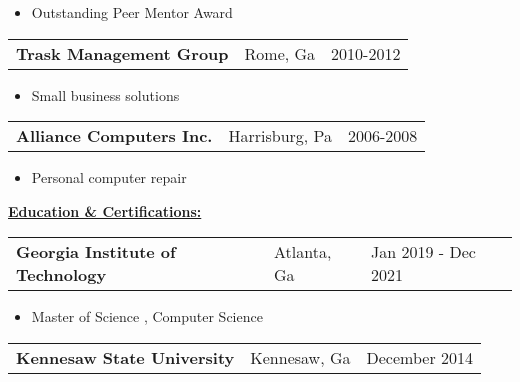 \documentclass{book}
\newenvironment{myitemize}
{ \begin{itemize}
	\setlength{\itemsep}{0pt}
	\setlength{\parskip}{0pt}
	\setlength{\parsep}{0pt}     }
{ \end{itemize}                  }
\begin{document}
	\begin{myitemize}
		\item Outstanding Peer Mentor Award 
	\end{myitemize} 


\begin{tabular}{L{3in}L{1.75in}R{1.75in}}

	 {\large {\bfseries Trask Management Group}} & Rome, Ga & 2010-2012 \\

\end{tabular}

\begin{myitemize}
	
	\item Small business solutions

\end{myitemize}

\begin{tabular}{L{3in}L{1.75in}R{1.75in}}

	 {\large {\bfseries Alliance Computers Inc.}} & Harrisburg, Pa & 2006-2008 \\

\end{tabular}

\begin{myitemize}
	
	\item Personal computer repair

\end{myitemize}

\underline{\Large {\bfseries Education \& Certifications:}}

\enspace

\begin{tabular}{L{3in}L{1.75in}R{1.75in}}

	{\large {\bfseries Georgia Institute of Technology}} & Atlanta, Ga & Jan 2019 - Dec 2021 \\%

\end{tabular}

\begin{myitemize}

	\item Master of Science , Computer Science 

\end{myitemize}

\begin{tabular}{L{3in}L{1.75in}R{1.75in}}

	{\large {\bfseries Kennesaw State University}} & Kennesaw, Ga & December 2014 \\%

\end{tabular}
\end{document}
